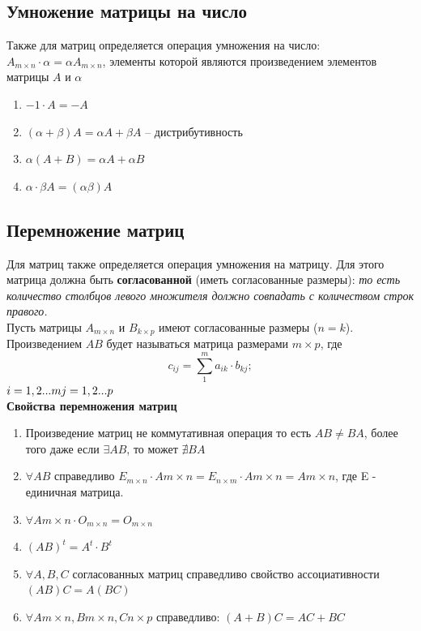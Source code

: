 \documentclass[oneside]{book}
\begin{document}
\begin{itemize}
\begin{enumerate}
\subsection{Умножение матрицы на число}
Также для матриц определяется операция умножения на число:\\
$A_{m\times n}\cdot \alpha=\alpha A_{m\times n}$, элементы которой являются произведением элементов матрицы $A$ и $\alpha$
\begin{enumerate}
\item $-1\cdot A=-A$
\item $(\alpha + \beta)A=\alpha A + \beta A$ -- дистрибутивность
\item $\alpha (A+B)= \alpha A + \alpha B$
\item $\alpha \cdot \beta A = (\alpha \beta) A$
\end{enumerate}
\subsection{Перемножение матриц}
Для матриц также определяется операция умножения на матрицу. Для этого матрица должна быть \textbf{согласованной} (иметь согласованные размеры): \textit{то есть количество столбцов левого множителя должно совпадать с количеством строк правого.}\\
Пусть матрицы 	$A_{m\times n}$	и $B_{k\times p}$ имеют согласованные размеры ($n=k$). Произведением $AB$ будет называться матрица размерами $m\times p$, где 
$$c_{i j}=\sum_{1}^{m} a_{i k}\cdot b_{k j};$$ $i= 1, 2... m\\ j= 1, 2... p$\\
\textbf{Свойства перемножения матриц}
\begin{enumerate}
\item  Произведение матриц не коммутативная операция то есть $AB\ne BA$, более того даже если $\exists AB$, то может $\nexists BA$	
\item $\forall AB$ справедливо $E_{m\times n}\cdot A{m\times n}=E_{n\times m}\cdot A{m\times n}=A{m\times n}$, где E - единичная матрица.
\item $\forall A{m\times n}\cdot O_{m\times n} = O_{m\times n} $
\item $(AB)^{t}=A^{t}\cdot B^{t}$
\item $\forall A, B, C$ согласованных матриц справедливо свойство ассоциативности $(AB)C=A(BC)$ 
\item $\forall A{m\times n}, B{m\times n}, C{n\times p}$ справедливо: $(A+B)C=AC+BC$
\end{enumerate}


\end{enumerate}
\end{itemize}
\end{document}
